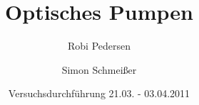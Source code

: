 \documentclass[a4paper,oneside]{scrartcl} %
\title{Optisches Pumpen}
\author{Robi Pedersen \and Simon Schmeißer}
\date{Versuchsdurchführung 21.03. - 03.04.2011}
\begin{document}
\begin{titlepage}
  \maketitle
  \vfill
  \thispagestyle{empty}
\end{titlepage}

\renewcommand*\contentsname{Table Of Contents}
\tableofcontents
\clearpage








\clearpage

% 
%
\end{document}
